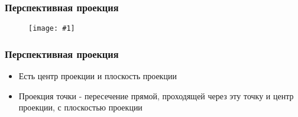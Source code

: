 \documentclass{beamer}
\newcommand{\slideimage}[1]{
  \begin{figure}
    \begin{adjustbox}{width=\textwidth, totalheight=\textheight-2\baselineskip-2\baselineskip,keepaspectratio}
      \texttt{[image: \#1]}
    \end{adjustbox}
  \end{figure}
}
\begin{document}
\begin{frame}[fragile]
\frametitle{Перспективная проекция}
\slideimage{perspective.png}
\end{frame}

\begin{frame}[fragile]
\frametitle{Перспективная проекция}
\begin{itemize}
\item Есть {\color{blue}центр проекции} и {\color{blue}плоскость проекции}
\item {\color{red}Проекция} {\color{green}точки} - пересечение {\color{magenta}прямой}, проходящей через эту {\color{green}точку} и {\color{blue}центр проекции}, с {\color{blue}плоскостью проекции}
\end{itemize}
\pause
\begin{center}
\end{center}
\end{frame}
\end{document}
